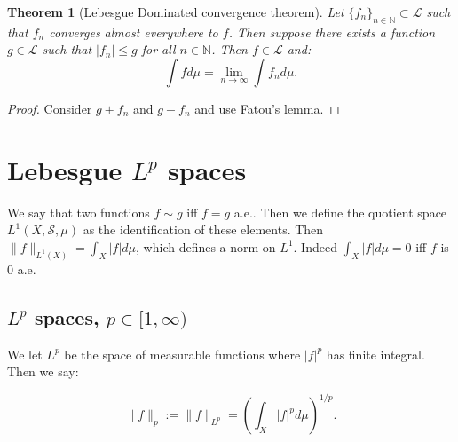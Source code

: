\documentclass{article}
\newtheorem{theorem}{Theorem}
\theoremstyle{definition}
\numberwithin{theorem}{section}
\numberwithin{equation}{section}
\begin{document}
\begin{theorem}[Lebesgue Dominated convergence theorem]
	Let $\lbrace f_n \rbrace_{n \in \mathbb{N}} \subset \mathcal{L}$ such that $f_n$ converges almost everywhere to $f$. Then suppose there exists a function $g \in \mathcal{L}$ such that $|f_n| \leq g$ for all $n \in \mathbb{N}$. Then $f \in \mathcal{L}$ and:
	\begin{equation}
		\int f d\mu = \lim_{n \rightarrow \infty} \int f_n d\mu.
	\end{equation}
\end{theorem}
\begin{proof}
	Consider $g + f_n$ and $g - f_n$ and use Fatou's lemma. 
\end{proof}

\section{Lebesgue $L^p$ spaces}
We say that two functions $f\sim g$ iff $f = g$ a.e.. Then we define the quotient space $L^1(X, \mathcal{S}, \mu)$ as the identification of these elements. Then $\|f \|_{L^1(X)} = \int_X |f| d\mu$, which defines a norm on $L^1$. Indeed $\int_X |f| d\mu = 0$ iff $f$ is 0 a.e. 

\subsection{$L^p$ spaces, $p \in [1, \infty)$}
We let $L^p$ be the space of measurable functions where $|f|^p$ has finite integral. Then we say:

\begin{equation}
	\|f \|_p := \|f\|_{L^p} = \left(\int_X |f|^p d\mu \right)^{1/p}.
\end{equation}
\end{document}
